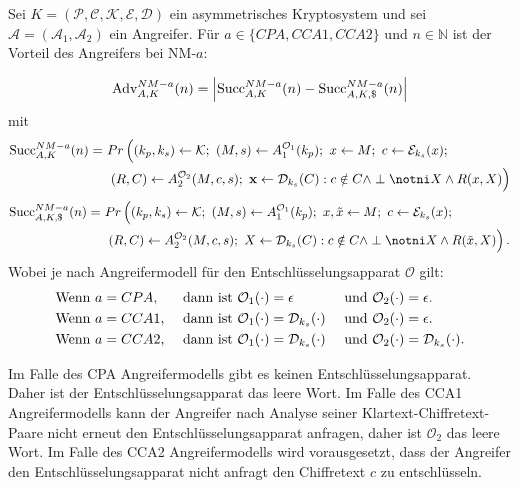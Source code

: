 \begin{theorem}
\label{DefKuV}
\qquad\qquad\qquad Sei $K = (\mathcal{P},\mathcal{C},\mathcal{K},\mathcal{E},\mathcal{D})$ ein asymmetrisches Kryptosystem und sei $\mathcal{A} = (\mathcal{A}_1,\mathcal{A}_2)$ ein Angreifer. Für $a\in\{CPA,CCA1,CCA2\}$ und $n\in\mathbb{N}$ ist der Vorteil des Angreifers bei NM-$a$:
	
\begin{equation*}
\normalfont
\text{Adv}^{NM-a}_{A,K}(n)= \left| \text{Succ}^{NM-a}_{A,K}(n)-\text{Succ}^{NM-a}_{A,K,\$}(n) \right| 
\end{equation*}	
mit
\begin{align*}
\normalfont
\text{Succ}^{NM-a}_{A,K}(n) =\
& Pr \left(  
(k_p,k_s)\leftarrow\mathcal{K};\
(M,s)\leftarrow A^{\mathcal{O}_1}_1(k_p);\
x\leftarrow M;\
c\leftarrow\mathcal{E}_{k_s}(x); \right.\\
& \left.  (R,C)\leftarrow A^{\mathcal{O}_2}_2(M,c,s);\
\textbf{x}\leftarrow\mathcal{D}_{k_s}(C) : c\notin C \wedge \perp\notni X \wedge R(x,X)  \right)
\end{align*}		
\begin{align*}
\normalfont
\text{Succ}^{NM-a}_{A,K,\$}(n) =\
& Pr\left( 
(k_p,k_s)\leftarrow\mathcal{K};\
(M,s)\leftarrow A^{\mathcal{O}_1}_1(k_p);\
x,\tilde{x}\leftarrow M;\
c\leftarrow\mathcal{E}_{k_s}(x); \right.\\
& \left. (R,C)\leftarrow A^{\mathcal{O}_2}_2(M,c,s);\
X\leftarrow\mathcal{D}_{k_s}(C) : c\notin C \wedge \perp\notni X\wedge R(\tilde{x},X)
\right).
\end{align*}
Wobei je nach Angreifermodell für den Entschlüsselungsapparat $\mathcal{O}$ gilt:
\begin{alignat*}{3}
&\normalfont\text{Wenn}\ a=CPA, \ &&\normalfont\text{dann ist}\ \mathcal{O}_1(\cdot)= \epsilon\ &&\normalfont\text{und}\ \mathcal{O}_2(\cdot) = \epsilon.\\
&\normalfont\text{Wenn}\ a=CCA1, \ &&\normalfont\text{dann ist}\ \mathcal{O}_1(\cdot)=\mathcal{D}_{k_s}(\cdot)\ &&\normalfont\text{und}\ \mathcal{O}_2(\cdot) = \epsilon.\\
&\normalfont\text{Wenn}\ a=CCA2, \ &&\normalfont\text{dann ist}\ \mathcal{O}_1(\cdot)=\mathcal{D}_{k_s}(\cdot)\ &&\normalfont\text{und}\ \mathcal{O}_2(\cdot) = \mathcal{D}_{k_s}(\cdot).\\
\end{alignat*}
\end{theorem}
Im Falle des CPA Angreifermodells gibt es keinen Entschlüsselungsapparat. Daher ist der Entschlüsselungsapparat das leere Wort. Im Falle des CCA1 Angreifermodells kann der Angreifer nach Analyse seiner Klartext-Chiffretext-Paare nicht erneut den Entschlüsselungsapparat anfragen, daher ist $\mathcal{O}_2$ das leere Wort. Im Falle des CCA2 Angreifermodells wird vorausgesetzt, dass der Angreifer den Entschlüsselungsapparat nicht anfragt den Chiffretext $c$ zu entschlüsseln.

